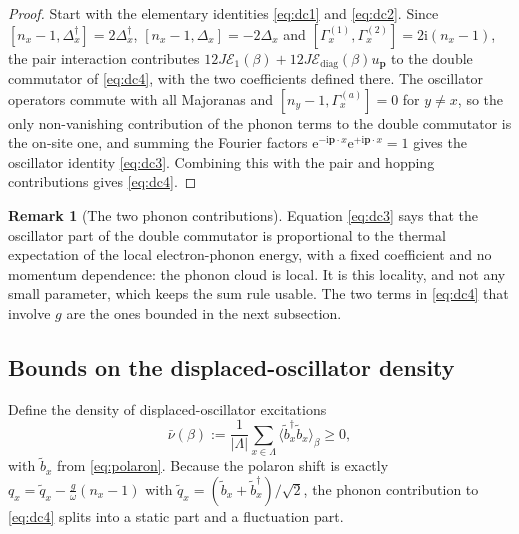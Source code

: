 \documentclass[11pt]{article}
\numberwithin{equation}{section}
\newcommand{\e}{\mathrm{e}}
\newcommand{\ii}{\mathrm{i}}
\newcommand{\Lamb}{\Lambda}
\newcommand{\Gam}{\Gamma}
\theoremstyle{definition}
\newtheorem{remark}[theorem]{Remark}
\begin{document}
\begin{proof}
Start with the elementary identities \eqref{eq:dc1} and \eqref{eq:dc2}. Since
$[n_{x}-1,\Delta_{x}^{\dagger}]=2\Delta_{x}^{\dagger}$,
$[n_{x}-1,\Delta_{x}]=-2\Delta_{x}$ and $[\Gam^{(1)}_{x},\Gam^{(2)}_{x}]=2\ii(n_{x}-1)$,
the pair interaction contributes $12J\mathcal{E}_{1}(\beta)+12J\mathcal{E}_{\mathrm{diag}}(\beta)u_{\mathbf p}$
to the double commutator of \eqref{eq:dc4}, with the two coefficients defined there. The oscillator operators
commute with all Majoranas and $[n_{y}-1,\Gam^{(a)}_{x}]=0$ for $y\ne x$, so the only
non-vanishing contribution of the phonon terms to the double commutator is the on-site
one, and summing the Fourier factors $\e^{-\ii\mathbf p\cdot x}\e^{+\ii\mathbf p\cdot x}=1$
gives the oscillator identity \eqref{eq:dc3}. Combining this with the pair and hopping
contributions gives \eqref{eq:dc4}.
\end{proof}

\begin{remark}[The two phonon contributions]\label{rem:twophonon}
Equation \eqref{eq:dc3} says that the oscillator part of the double commutator is proportional to
the thermal expectation of the local electron-phonon energy, with a fixed coefficient and
no momentum dependence: the phonon cloud is local. It is this locality, and not any small
parameter, which keeps the sum rule usable. The two terms in \eqref{eq:dc4} that involve $g$ are
the ones bounded in the next subsection.
\end{remark}

\subsection{Bounds on the displaced-oscillator density}

Define the density of displaced-oscillator excitations
\begin{equation}
\bar\nu(\beta):=\frac{1}{|\Lamb|}\sum_{x\in\Lamb}\big\langle\tilde b_{x}^{\dagger}\tilde b_{x}\big\rangle_{\beta}\ge0 ,
\label{eq:nubar}
\end{equation}
with $\tilde b_{x}$ from \eqref{eq:polaron}. Because the polaron shift is exactly
$q_{x}=\tilde q_{x}-\frac{g}{\omega}(n_{x}-1)$ with
$\tilde q_{x}=(\tilde b_{x}+\tilde b_{x}^{\dagger})/\sqrt2$, the phonon contribution to
\eqref{eq:dc4} splits into a static part and a fluctuation part.
\end{document}
